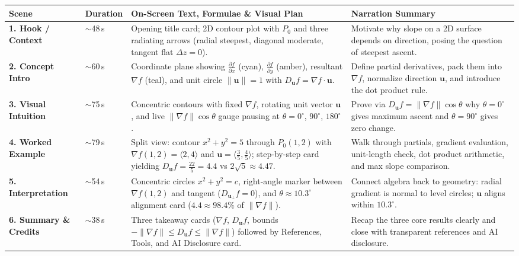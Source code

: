 \documentclass[10pt,a4paper]{article}
\begin{document}
\small
\begin{tabularx}{\textwidth}{@{}p{2.2cm} p{1.3cm} X X@{}}
\toprule
\rowcolor{slate}
{\color{white}\textbf{Scene}} & {\color{white}\textbf{Duration}} & {\color{white}\textbf{On-Screen Text, Formulae \& Visual Plan}} & {\color{white}\textbf{Narration Summary}} \\
\midrule

\textbf{1. Hook / Context} &
$\sim$48\,s &
Opening title card; 2D contour plot with $P_0$ and three radiating arrows (radial steepest, diagonal moderate, tangent flat $\Delta z = 0$). &
Motivate why slope on a 2D surface depends on direction, posing the question of steepest ascent. \\
\midrule

\rowcolor{rowtint}
\textbf{2. Concept Intro} &
$\sim$60\,s &
Coordinate plane showing $\frac{\partial f}{\partial x}$ (cyan), $\frac{\partial f}{\partial y}$ (amber), resultant $\nabla f$ (teal), and unit circle $\|\mathbf{u}\|=1$ with $D_{\mathbf{u}} f = \nabla f \cdot \mathbf{u}$. &
Define partial derivatives, pack them into $\nabla f$, normalize direction $\mathbf{u}$, and introduce the dot product rule. \\
\midrule

\textbf{3. Visual Intuition} &
$\sim$75\,s &
Concentric contours with fixed $\nabla f$, rotating unit vector $\mathbf{u}$, and live $\|\nabla f\|\cos\theta$ gauge pausing at $\theta=0^\circ$, $90^\circ$, $180^\circ$. &
Prove via $D_{\mathbf{u}} f = \|\nabla f\|\cos\theta$ why $\theta=0^\circ$ gives maximum ascent and $\theta=90^\circ$ gives zero change. \\
\midrule

\rowcolor{rowtint}
\textbf{4. Worked Example} &
$\sim$79\,s &
Split view: contour $x^2+y^2=5$ through $P_0(1,2)$ with $\nabla f(1,2)=\langle 2,4\rangle$ and $\mathbf{u}=\langle\frac{3}{5},\frac{4}{5}\rangle$; step-by-step card yielding $D_{\mathbf{u}} f = \frac{22}{5}=4.4$ vs $2\sqrt{5}\approx 4.47$. &
Walk through partials, gradient evaluation, unit-length check, dot product arithmetic, and max slope comparison. \\
\midrule

\textbf{5. Interpretation} &
$\sim$54\,s &
Concentric circles $x^2+y^2=c$, right-angle marker between $\nabla f(1,2)$ and tangent ($D_{\mathbf{u}_\perp}f=0$), and $\theta\approx 10.3^\circ$ alignment card ($4.4 \approx 98.4\%$ of $\|\nabla f\|$). &
Connect algebra back to geometry: radial gradient is normal to level circles; $\mathbf{u}$ aligns within $10.3^\circ$. \\
\midrule

\rowcolor{rowtint}
\textbf{6. Summary \& Credits} &
$\sim$38\,s &
Three takeaway cards ($\nabla f$, $D_{\mathbf{u}}f$, bounds $-\|\nabla f\|\le D_{\mathbf{u}}f\le\|\nabla f\|$) followed by References, Tools, and AI Disclosure card. &
Recap the three core results clearly and close with transparent references and AI disclosure. \\
\bottomrule
\end{tabularx}
\end{document}
